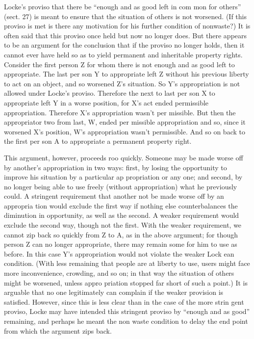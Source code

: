 \documentclass[11pt,openany]{book}
\begin{document}
Locke's proviso that there be ``enough and as good left in com mon for others'' (sect. 27) is meant to ensure that the situation of others is not worsened. (If this proviso is met is there any motivation for his further condition of nonwaste?) It is often said that this proviso once held but now no longer does. But there appears to be an argument for the conclusion that if the proviso no longer holds, then it cannot ever have held so as to yield permanent and inheritable property rights. Consider the first person Z for whom there is not enough and as good left to appropriate. The last per son Y to appropriate left Z without his previous liberty to act on an object, and so worsened Z's situation. So Y's appropriation is not allowed under Locke's proviso. Therefore the next to last per son X to appropriate left Y in a worse position, for X's act ended permissible appropriation. Therefore X's appropriation wasn't per missible. But then the appropriator two from last, W, ended per missible appropriation and so, since it worsened X's position, W's appropriation wasn't permissible. And so on back to the first per son A to appropriate a permanent property right. 

This argument, however, proceeds roo quickly. Someone may be made worse off by another's appropriation in two ways: first, by losing the opportunity to improve his situation by a particular ap propriation or any one; and second, by no longer being able to use freely (without appropriation) what he previously could. A stringent requirement that another not be made worse off by an appropria tion would exclude the first way if nothing else counterbalances the diminution in opportunity, as well as the second. A weaker requirement would exclude the second way, though not the first. With the weaker requirement, we cannot zip back so quickly from Z to A, as in the above argument; for though person Z can no longer appropriate, there may remain some for him to use as before. In this case Y's appropriation would not violate the weaker Lock ean condition. (With less remaining that people are at liberty to use, users might face more inconvenience, crowding, and so on; in that way the situation of others might be worsened, unless appro priation stopped far short of such a point.) It is arguable that no one legitimately can complain if the weaker provision is satisfied. However, since this is less clear than in the case of the more strin gent proviso, Locke may have intended this stringent proviso by ``enough and as good'' remaining, and perhaps he meant the non waste condition to delay the end point from which the argument zips back. 
\end{document}
